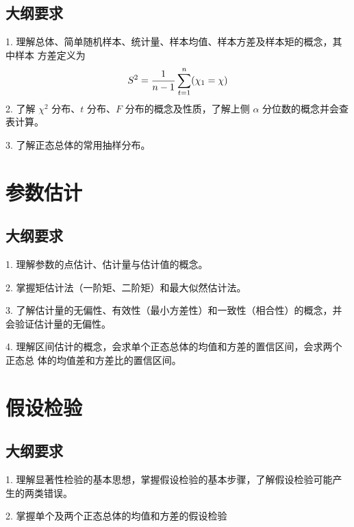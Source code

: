 \subsection{大纲要求}

1. 理解总体、简单随机样本、统计量、样本均值、样本方差及样本矩的概念，其中样本
方差定义为
\[ S^2 = \frac{1}{n-1} \sum_{t=1}^n (\chi_1 = \chi) \cal \]
2. 了解 $\chi^2$ 分布、$t$ 分布、$F$ 分布的概念及性质，了解上侧 $\alpha$ 分位数的概念并会查表计算。

3. 了解正态总体的常用抽样分布。


\section{参数估计}

\subsection{大纲要求}

1. 理解参数的点估计、估计量与估计值的概念。

2. 掌握矩估计法（一阶矩、二阶矩）和最大似然估计法。

3. 了解估计量的无偏性、有效性（最小方差性）和一致性（相合性）的概念，并会验证估计量的无偏性。

4. 理解区间估计的概念，会求单个正态总体的均值和方差的置信区间，会求两个正态总
体的均值差和方差比的置信区间。


\section{假设检验}

\subsection{大纲要求}

1. 理解显著性检验的基本思想，掌握假设检验的基本步骤，了解假设检验可能产生的两类错误。

2. 掌握单个及两个正态总体的均值和方差的假设检验
